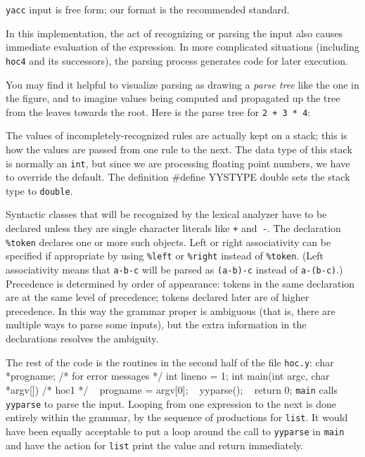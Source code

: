 {{\tt yacc} input is free form; our format is the recommended standard.

In this implementation, the act of recognizing or parsing the input
also causes immediate evaluation of the expression. In more
complicated situations (including {\tt hoc4} and its successors),
the parsing process generates code for later execution.

You may find it helpful to visualize parsing as drawing a
{\it parse tree\/} like the one in the figure, and to imagine
values being computed and propagated up the tree from the leaves
towards the root. Here is the parse tree for {\tt 2 + 3 * 4}:
\medskip
\centerline{}
\medskip
\noindent
The values of incompletely-recognized rules are actually kept
on a stack; this is how the values are passed from one rule
to the next. The data type of this stack is normally an {\tt int},
but since we are processing floating point numbers, we have to
override the default. The definition
\begincode
#define YYSTYPE double
\endcode\noindent
sets the stack type to {\tt double}.

Syntactic classes that will be recognized by the lexical analyzer
have to be declared unless they are single character literals like
{\tt+} and~{\tt-}. The declaration {\tt\%token} declares one or
more such objects. Left or right associativity can be specified
if appropriate by using {\tt\%left} or {\tt\%right} instead of
{\tt\%token}. (Left associativity means that {\tt a-b-c} will
be parsed as {\tt(a-b)-c} instead of {\tt a-(b-c)}.)
Precedence is determined by order of appearance: tokens
in the same declaration are at the same level of precedence;
tokens declared later are of higher precedence. In this way
the grammar proper is ambiguous (that is, there are multiple
ways to parse some inputs), but the extra information in the
declarations resolves the ambiguity.

The rest of the code is the routines in the second half of the
file {\tt hoc.y}:
\begincode
char    *progname;       /* for error messages */
int     lineno = 1;
\medskip
int main(int argc, char *argv[])  /* hoc1 */
{
~       progname = argv[0];
~       yyparse();
~       return 0;
}
\endcode
\noindent
{\tt main} calls {\tt yyparse} to parse the input. Looping from
one expression to the next is done entirely within the grammar,
by the sequence of productions for {\tt list}. It would have been
equally acceptable to put a loop around the call to {\tt yyparse}
in {\tt main} and have the action for {\tt list} print the value
and return immediately.

}
